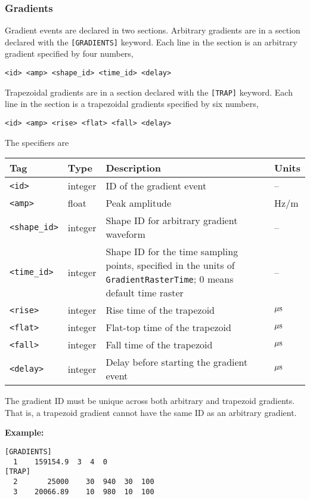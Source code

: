 \documentclass{article}
\begin{document}
\subsubsection{Gradients}
Gradient events are declared in two sections. Arbitrary gradients are in a section declared with the \verb.[GRADIENTS]. keyword. Each line in the section is an arbitrary gradient specified by four numbers,
\begin{lstlisting}
<id> <amp> <shape_id> <time_id> <delay>
\end{lstlisting}
Trapezoidal gradients are in a section declared with the \verb.[TRAP]. keyword. Each line in the section is a trapezoidal gradients specified by six numbers,
\begin{lstlisting}
<id> <amp> <rise> <flat> <fall> <delay>
\end{lstlisting}

The specifiers are

\begin{tabularx}{\textwidth}{llXl}
\toprule
Tag & Type & Description & Units\\
\midrule
\verb.<id>. & integer & ID of the gradient event & -- \\
\verb.<amp>. & float & Peak amplitude & Hz/m \\
\verb.<shape_id>. & integer & Shape ID for arbitrary gradient waveform & -- \\
\verb.<time_id>. & integer & Shape ID for the time sampling points, specified in the units of \verb.GradientRasterTime.; 0 means default time raster & -- \\
\verb.<rise>. & integer & Rise time of the trapezoid & $\rm \mu s$ \\
\verb.<flat>. & integer & Flat-top time of the trapezoid & $\rm \mu s$ \\
\verb.<fall>. & integer & Fall time of the trapezoid & $\rm \mu s$ \\
\verb.<delay>. & integer & Delay before starting the gradient event & $\rm \mu s$\\
\bottomrule
\end{tabularx}

The gradient ID must be unique across both arbitrary and trapezoid gradients. That is, a trapezoid gradient cannot have the same ID as an arbitrary gradient.


\begin{minipage}{\textwidth}
\textbf{Example:}
\begin{lstlisting}
[GRADIENTS]
  1    159154.9  3  4  0
[TRAP]
  2       25000    30  940  30  100
  3    20066.89    10  980  10  100
\end{lstlisting}
\end{minipage}
\end{document}
